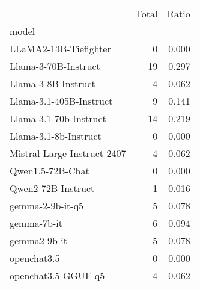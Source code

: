 \begin{tabular}{lrr}
\hline
 & Total & Ratio \\
model &  &  \\
LLaMA2-13B-Tiefighter & 0 & 0.000 \\
Llama-3-70B-Instruct & 19 & 0.297 \\
Llama-3-8B-Instruct & 4 & 0.062 \\
Llama-3.1-405B-Instruct & 9 & 0.141 \\
Llama-3.1-70b-Instruct & 14 & 0.219 \\
Llama-3.1-8b-Instruct & 0 & 0.000 \\
Mistral-Large-Instruct-2407 & 4 & 0.062 \\
Qwen1.5-72B-Chat & 0 & 0.000 \\
Qwen2-72B-Instruct & 1 & 0.016 \\
gemma-2-9b-it-q5 & 5 & 0.078 \\
gemma-7b-it & 6 & 0.094 \\
gemma2-9b-it & 5 & 0.078 \\
openchat3.5 & 0 & 0.000 \\
openchat3.5-GGUF-q5 & 4 & 0.062 \\
\hline
\end{tabular}
